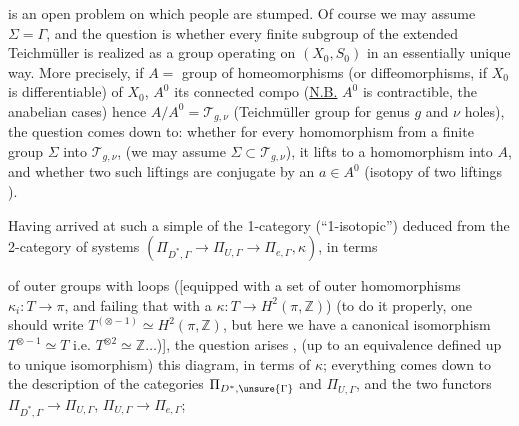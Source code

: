 is an open problem on which
people are stumped. Of course we may assume \(\Sigma=\Gamma\),
and the question is whether every finite subgroup
of the extended Teichmüller is
realized as a group operating on \((X_0,S_0)\) 
in an essentially unique way. More
precisely, if  \(A=\) group of homeomorphisms
(or diffeomorphisms, if \(X_0\) is
differentiable) of \(X_0\), \(A^0\) its connected compo
(\uline{N.B.} \(A^0\) is contractible, \deleted{\unsure{)}}
the anabelian cases) hence \(A/A^0=\mathcal T_{g,\nu}\)
(Teichmüller group for genus \(g\) and \(\nu\)
holes), the question comes down to:  whether for every
homomorphism from a finite group \(\Sigma\) into  \(\mathcal T_{g,\nu}\),
(we may assume \(\Sigma\subset\mathcal T_{g,\nu}\)), it lifts
to a homomorphism into \(A\), and whether two such
liftings are conjugate by an \(a\in A^0\)
(isotopy  of two liftings \unsure{\(\sim\)}).

Having arrived at such a simple 
of the 1-category (``1-isotopic'') deduced
from the 2-category of systems
\((\Pi_{D^*,\Gamma}\longrightarrow\Pi_{U,\Gamma}\longrightarrow\Pi_{e,\Gamma},\kappa)\), in terms

of outer groups with loops (\inserted{\(\pi\)}[equipped
with a set of outer homomorphisms \(\kappa_i:T\longrightarrow\pi\), and
failing that with a \(\kappa:T\longrightarrow H^2(\pi,\mathbb Z)\))
(to do it properly, one should write
\(T^{(\otimes-1)}\simeq H^2(\pi,\mathbb Z)\), but here we have a canonical
isomorphism \(T^{\otimes-1}\simeq T\) i.e. \(T^{\otimes 2}\simeq\mathbb Z\ldots\))],
the question arises ,
(up to an equivalence defined up to unique isomorphism)
this diagram, in terms of \(\kappa\); everything
comes down to the  description of the
categories \(\Pi_{D^*,\unsure{\Gamma}}\) and \(\Pi_{U,\Gamma}\), and the two
functors \(\Pi_{D^*,\Gamma}\longrightarrow\Pi_{U,\Gamma}\), \(\Pi_{U,\Gamma}\longrightarrow\Pi_{e,\Gamma}\);

